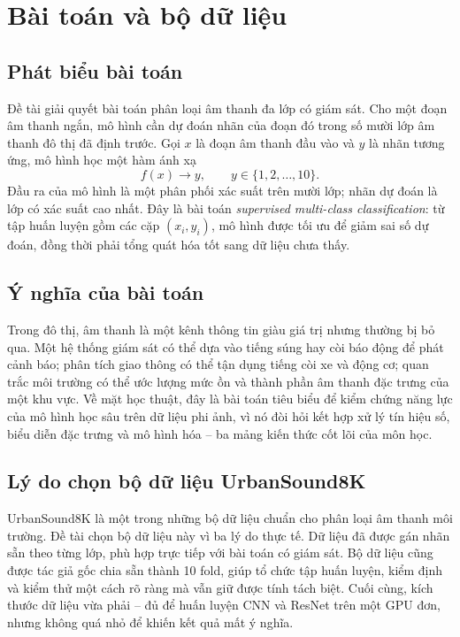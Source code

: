 \section{Bài toán và bộ dữ liệu}
\label{sec:problem}

\subsection{Phát biểu bài toán}

Đề tài giải quyết bài toán phân loại âm thanh đa lớp có giám sát. Cho một đoạn
âm thanh ngắn, mô hình cần dự đoán nhãn của đoạn đó trong số mười lớp âm thanh đô
thị đã định trước. Gọi $x$ là đoạn âm thanh đầu vào và $y$ là nhãn tương ứng, mô
hình học một hàm ánh xạ
\[
f(x) \to y, \qquad y \in \{1, 2, \dots, 10\}.
\]
Đầu ra của mô hình là một phân phối xác suất trên mười lớp; nhãn dự đoán là lớp
có xác suất cao nhất. Đây là bài toán \textit{supervised multi-class
classification}: từ tập huấn luyện gồm các cặp $(x_i, y_i)$, mô hình được tối ưu
để giảm sai số dự đoán, đồng thời phải tổng quát hóa tốt sang dữ liệu chưa thấy.

\subsection{Ý nghĩa của bài toán}

Trong đô thị, âm thanh là một kênh thông tin giàu giá trị nhưng thường bị bỏ qua.
Một hệ thống giám sát có thể dựa vào tiếng súng hay còi báo động để phát cảnh
báo; phân tích giao thông có thể tận dụng tiếng còi xe và động cơ; quan trắc môi
trường có thể ước lượng mức ồn và thành phần âm thanh đặc trưng của một khu vực.
Về mặt học thuật, đây là bài toán tiêu biểu để kiểm chứng năng lực của mô hình
học sâu trên dữ liệu phi ảnh, vì nó đòi hỏi kết hợp xử lý tín hiệu số, biểu diễn
đặc trưng và mô hình hóa -- ba mảng kiến thức cốt lõi của môn học.

\subsection{Lý do chọn bộ dữ liệu UrbanSound8K}

UrbanSound8K là một trong những bộ dữ liệu chuẩn cho phân loại âm thanh môi
trường. Đề tài chọn bộ dữ liệu này vì ba lý do thực tế. Dữ liệu đã được gán nhãn
sẵn theo từng lớp, phù hợp trực tiếp với bài toán có giám sát. Bộ dữ liệu cũng
được tác giả gốc chia sẵn thành 10 fold, giúp tổ chức tập huấn luyện, kiểm định
và kiểm thử một cách rõ ràng mà vẫn giữ được tính tách biệt. Cuối cùng, kích
thước dữ liệu vừa phải -- đủ để huấn luyện CNN và ResNet trên một GPU đơn, nhưng
không quá nhỏ để khiến kết quả mất ý nghĩa.

